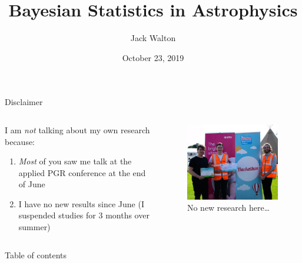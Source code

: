 \documentclass[aspectratio=169]{beamer}
\author{Jack Walton}
\title{Bayesian Statistics in Astrophysics}
\date{October 23, 2019}
\begin{document}
\maketitle

\begin{frame}{Disclaimer}
  \begin{columns}
    \begin{column}{0.5\textwidth}
  I am \emph{not} talking about my own research because:	
  \begin{enumerate}
    \item \emph{Most} of you saw me talk at the applied PGR conference at the end
    	of June
    \item I have no new results since June (I suspended studies for 3 months 
    	over summer)
  \end{enumerate}
  \end{column}
  \begin{column}{0.5\textwidth}
    \begin{figure}
      \includegraphics[width=\textwidth]{win.jpg}
      \caption{No new research here\ldots}
    \end{figure}
  \end{column}
  \end{columns}
\end{frame}

\begin{frame}{Table of contents}
    \tableofcontents
\end{frame}
\end{document}
